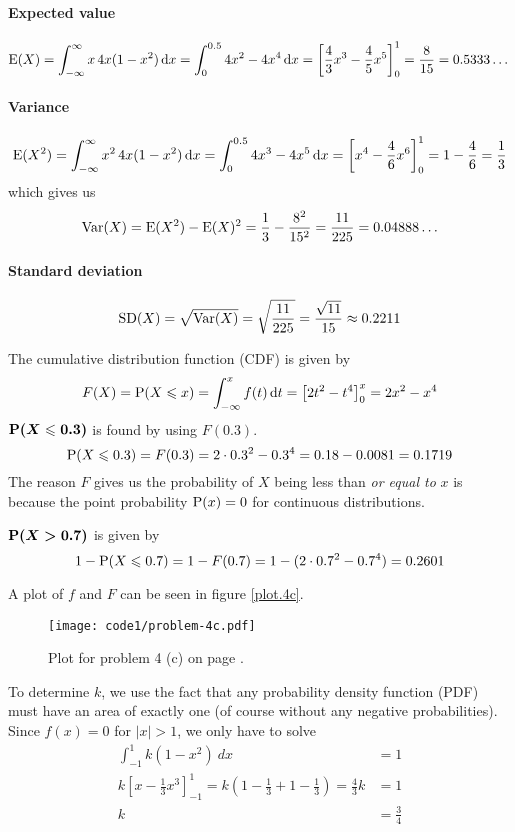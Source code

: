 \documentclass[a4paper,english,12pt]{article}
\begin{document}
\paragraph{Expected value}
\[
  \mathrm{E}(X)
    = \int_{-\infty}^{\infty} x\,4x(1-x^2)\, \mathrm{d} x
    = \int_{0}^{0.5} 4x^2 - 4x^4 \, \mathrm{d} x
    = \left[ \frac{4}{3}x^3 - \frac{4}{5}x^5 \right]_{0}^{1}
    = \frac{8}{15} = 0.5333\dots
\]
\paragraph{Variance}
\begin{align*}
  \mathrm{E}(X^2)
    = \int_{-\infty}^{\infty} x^2\,4x(1-x^2)\, \mathrm{d} x
    = \int_{0}^{0.5} 4x^3 - 4x^5 \, \mathrm{d} x
    = \left[ x^4 - \frac{4}{6}x^6 \right]_{0}^{1}
    = 1 - \frac{4}{6} = \frac{1}{3}
\end{align*}
which gives us
\begin{align*}
  \mathrm{Var}(X) = \mathrm{E}(X^2) - \mathrm{E}(X)^2 = \frac{1}{3} - \frac{8^2}{15^2} =
    \frac{11}{225} = 0.04888\dots
\end{align*}
\paragraph{Standard deviation}\[
  \mathrm{SD}(X) = \sqrt{\mathrm{Var}(X)} = \sqrt{\frac{11}{225}} = \frac{\sqrt{11}}{15}
  \approx 0.2211
\]

The cumulative distribution function (CDF) is given by
\[
  F(X) = \mathrm{P}(X \leqslant x) = \int_{-\infty}^{x} f(t)\, \mathrm{d}t
    = \left[ 2t^2 - t^4 \right]_{0}^{x} = 2x^2 - x^4
\]
$\boldsymbol{\mathrm{P}(X \leqslant 0.3)}$ is found by using $F(0.3)$.
\[
  \mathrm{P}(X \leqslant 0.3) = F(0.3) = 2\cdot0.3^2 - 0.3^4 = 0.18 - 0.0081 = 0.1719
\]
The reason $F$ gives us the probability of $X$ being less than \textit{or equal
to} $x$ is because the point probability $\mathrm{P}(x) = 0$ for continuous
distributions.

$\boldsymbol{\mathrm{P}(X > 0.7)}$ is given by
\[
  1 - \mathrm{P}(X \leqslant 0.7) = 1 - F(0.7)
    = 1 - (2\cdot 0.7^2 - 0.7^4) = 0.2601
\]

A plot of $f$ and $F$ can be seen in figure \vref{plot.4c}.
  \begin{figure}[H]
  \texttt{[image: code1/problem-4c.pdf]}
  \caption{Plot for problem 4 (c) on page \pageref{problem.4 (c)}.}
  \label{plot.4c}
\end{figure}

To determine $k$, we use the fact that any probability density function (PDF)
must have an area of exactly one (of course without any negative
probabilities). Since $f(x) = 0$ for $|x| > 1$, we only have to solve
\begin{align*}
  \int_{-1}^{1}{k(1-x^2)~dx} &= 1 \\
  k\left[ x - \frac{1}{3}{x^3} \right]_{-1}^{1} =
  k\left( 1 - \frac{1}{3} + 1 - \frac{1}{3} \right) = \frac{4}{3}k &= 1 \\
   k &= \frac{3}{4}
\end{align*}
\end{document}
